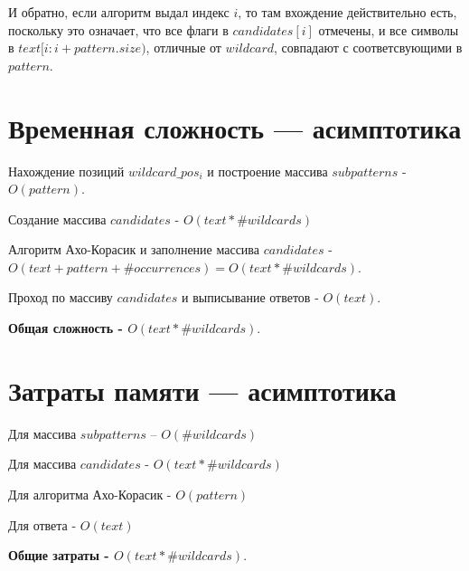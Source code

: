 \documentclass{article}
\begin{document}
И обратно, если алгоритм выдал индекс $i$, то там вхождение действительно есть, поскольку это означает, что все флаги в $candidates[i]$ отмечены, и все символы в $text[i:i + pattern.size)$, отличные от $wildcard$, совпадают с соответсвующими в $pattern$. 

\section{Временная сложность — асимптотика}

Нахождение позиций $wildcard\_pos_i$ и построение массива $subpatterns$  - $O(pattern)$.
\smallskip

Создание массива $candidates$ - $O(text * \# wildcards)$
\smallskip

Алгоритм Ахо-Корасик и заполнение массива $candidates$ - $O(text + pattern + \#occurrences) = O(text * \#wildcards)$.
\smallskip

Проход по массиву $candidates$ и выписывание ответов - $O(text)$.
\smallskip

\textbf{Общая сложность - $O(text * \#wildcards)$}.

\section{Затраты памяти — асимптотика}

Для массива $subpatterns$ -- $O(\# wildcards)$
\smallskip

Для массива $candidates$ - $O(text * \#wildcards)$
\smallskip

Для алгоритма Ахо-Корасик - $O(pattern)$
\smallskip

Для ответа - $O(text)$
\smallskip

\textbf{Общие затраты - $O(text * \#wildcards)$}.
\end{document}

